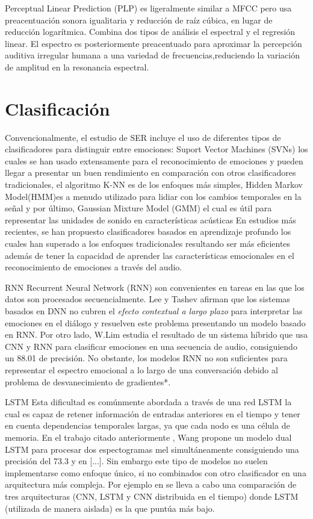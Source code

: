 \documentclass[11pt,a4paper,spanish]{book}
\begin{document}
	Perceptual Linear Prediction (PLP) es ligeralmente similar a MFCC pero usa preacentuación sonora igualitaria y reducción de raíz cúbica, en lugar de reducción logarítmica. Combina dos tipos de análisis el espectral y el regresión linear. El espectro es posteriormente preacentuado para aproximar la percepción auditiva irregular humana a una variedad de frecuencias,reduciendo la variación de amplitud en la resonancia espectral.
	
	\section{Clasificación}
	Convencionalmente, el estudio de SER incluye el uso de diferentes tipos de clasificadores para distinguir entre emociones: Suport Vector Machines (SVNs) los cuales se han usado extensamente para el reconocimiento de emociones y pueden llegar a presentar un buen rendimiento en comparación con otros clasificadores tradicionales, el algoritmo K-NN es de los enfoques más simples, Hidden Markov Model(HMM)es a menudo utilizado para lidiar con los cambios temporales en la señal y por último, Gaussian Mixture Model (GMM) el cual es útil para representar las unidades de sonido en características acústicas %
	En estudios más recientes, se han propuesto clasificadores basados en aprendizaje profundo los cuales han superado a los enfoques tradicionales resultando ser más eficientes además de tener la capacidad de aprender las características emocionales en el reconocimiento de emociones a través del audio.
	
	RNN 
	Recurrent Neural Network (RNN) son convenientes en tareas en las que los datos son procesados secuencialmente.
	Lee y Tashev \cite{Lee2015} afirman que los sistemas basados en DNN no cubren el \emph{efecto contextual a largo plazo} para interpretar las emociones en el diálogo y resuelven este problema presentando un modelo basado en RNN. Por otro lado, W.Lim \cite{Lim2017} estudia el resultado de un sistema híbrido que usa CNN y RNN para clasificar emociones en una secuencia de audio, consiguiendo un 88.01 de precisión.
	No obstante, los modelos RNN no son suficientes para representar el espectro emocional a lo largo de una conversación debido al problema de desvanecimiento de gradientes*.
	
	LSTM
	Esta dificultad es comúnmente abordada a través de una red LSTM la cual es capaz de retener información de entradas anteriores en el tiempo y tener en cuenta dependencias temporales largas, ya que cada nodo es una célula de memoria.
	En el trabajo citado anteriormente \cite{Wang2020}, Wang propone un modelo dual LSTM para procesar dos espectogramas mel simultáneamente consiguiendo una precisión del 73.3 y en [...]. 
	Sin embargo este tipo de modelos no suelen implementarse como enfoque único, si no combinados con otro clasificador en una arquitectura más compleja. Por ejemplo en \cite{Lim2017} se lleva a cabo una comparación de tres  arquitecturas (CNN, LSTM y CNN distribuida en el tiempo) donde LSTM (utilizada de manera aislada) es la que puntúa más bajo.
	
\end{document}
